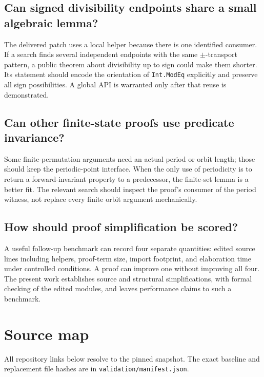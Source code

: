 \documentclass[11pt,letterpaper]{article}
\newcommand{\code}[1]{\nolinkurl{#1}}
\begin{document}
\subsection{Can signed divisibility endpoints share a small algebraic lemma?}

The delivered patch uses a local helper because there is one identified
consumer. If a search finds several independent endpoints with the same
$\pm$-transport pattern, a public theorem about divisibility up to sign could
make them shorter. Its statement should encode the orientation of
\code{Int.ModEq} explicitly and preserve all sign possibilities. A global API
is warranted only after that reuse is demonstrated.

\subsection{Can other finite-state proofs use predicate invariance?}

Some finite-permutation arguments need an actual period or orbit length; those
should keep the periodic-point interface. When the only use of periodicity is
to return a forward-invariant property to a predecessor, the finite-set lemma
is a better fit. The relevant search should inspect the proof's consumer of
the period witness, not replace every finite orbit argument mechanically.

\subsection{How should proof simplification be scored?}

A useful follow-up benchmark can record four separate quantities: edited
source lines including helpers, proof-term size, import footprint, and
elaboration time under controlled conditions. A proof can improve one without
improving all four. The present work establishes source and structural
simplifications, with formal checking of the edited modules, and leaves
performance claims to such a benchmark.

\appendix
\section{Source map}

All repository links below resolve to the pinned snapshot. The exact baseline
and replacement file hashes are in \code{validation/manifest.json}.
\end{document}
